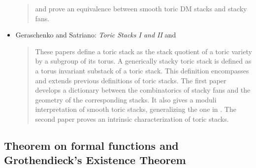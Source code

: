 \begin{itemize}
\begin{quote}
and prove an equivalence between smooth toric DM stacks and stacky fans.
\end{quote}
\item Geraschenko and Satriano: \emph{Toric Stacks I and II}
\cite{gs_toric1} and \cite{gs_toric2}
\begin{quote}
These papers define a toric stack as the stack quotient of a toric
variety by a subgroup of its torus. A generically stacky toric stack
is defined as a torus invariant substack of a toric stack. This definition
encompasses and extends previous definitions of toric stacks. The first
paper develops a dictionary between the combinatorics of stacky fans
and the geometry of the corresponding stacks. It also gives a moduli
interpretation of smooth toric stacks, generalizing the one in \cite{perroni}.
The second paper proves an intrinsic characterization of toric stacks.
\end{quote}
\end{itemize}



\subsection{Theorem on formal functions and Grothendieck's Existence Theorem}
\label{subsection-theorem-formal-functions}

